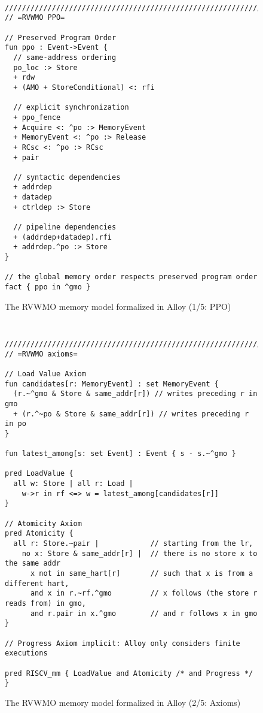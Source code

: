 \begin{figure}[h!]
  {
  \tt\bfseries\centering\footnotesize
  \begin{lstlisting}
////////////////////////////////////////////////////////////////////////////////
// =RVWMO PPO=

// Preserved Program Order
fun ppo : Event->Event {
  // same-address ordering
  po_loc :> Store
  + rdw
  + (AMO + StoreConditional) <: rfi

  // explicit synchronization
  + ppo_fence
  + Acquire <: ^po :> MemoryEvent
  + MemoryEvent <: ^po :> Release
  + RCsc <: ^po :> RCsc
  + pair

  // syntactic dependencies
  + addrdep
  + datadep
  + ctrldep :> Store

  // pipeline dependencies
  + (addrdep+datadep).rfi
  + addrdep.^po :> Store
}

// the global memory order respects preserved program order
fact { ppo in ^gmo }
\end{lstlisting}}
  \caption{The RVWMO memory model formalized in Alloy (1/5: PPO)}
  \label{fig:alloy1}
\end{figure}
\begin{figure}[h!]
  {
  \tt\bfseries\centering\footnotesize
  \begin{lstlisting}
////////////////////////////////////////////////////////////////////////////////
// =RVWMO axioms=

// Load Value Axiom
fun candidates[r: MemoryEvent] : set MemoryEvent {
  (r.~^gmo & Store & same_addr[r]) // writes preceding r in gmo
  + (r.^~po & Store & same_addr[r]) // writes preceding r in po
}

fun latest_among[s: set Event] : Event { s - s.~^gmo }

pred LoadValue {
  all w: Store | all r: Load |
    w->r in rf <=> w = latest_among[candidates[r]]
}

// Atomicity Axiom
pred Atomicity {
  all r: Store.~pair |            // starting from the lr,
    no x: Store & same_addr[r] |  // there is no store x to the same addr
      x not in same_hart[r]       // such that x is from a different hart,
      and x in r.~rf.^gmo         // x follows (the store r reads from) in gmo,
      and r.pair in x.^gmo        // and r follows x in gmo
}

// Progress Axiom implicit: Alloy only considers finite executions

pred RISCV_mm { LoadValue and Atomicity /* and Progress */ }

\end{lstlisting}}
  \caption{The RVWMO memory model formalized in Alloy (2/5: Axioms)}
  \label{fig:alloy2}
\end{figure}

